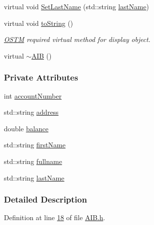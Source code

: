 \begin{DoxyCompactItemize}
\item 
virtual void \hyperlink{class_a_i_b_afe4e3c7b481bf87437968dde2cc75882_afe4e3c7b481bf87437968dde2cc75882}{Set\+Last\+Name} (std\+::string \hyperlink{class_a_i_b_ace7b8b648d1b44b7ee2f4be002952b7a_ace7b8b648d1b44b7ee2f4be002952b7a}{last\+Name})
\item 
virtual void \hyperlink{class_a_i_b_aff0f0a0db75a17efec4bd500b888232d_aff0f0a0db75a17efec4bd500b888232d}{to\+String} ()
\begin{DoxyCompactList}\small\item\em \hyperlink{class_o_s_t_m}{O\+S\+TM} required virtual method for display object. \end{DoxyCompactList}\item 
virtual \hyperlink{class_a_i_b_a22b11c50b0986326c86315957528bf79_a22b11c50b0986326c86315957528bf79}{$\sim$\+A\+IB} ()
\end{DoxyCompactItemize}
\subsubsection*{Private Attributes}
\begin{DoxyCompactItemize}
\item 
int \hyperlink{class_a_i_b_aafc08efeec5b8c800c32ee32f20603a7_aafc08efeec5b8c800c32ee32f20603a7}{account\+Number}
\item 
std\+::string \hyperlink{class_a_i_b_ae6a67cc33d1e5fa83a52a238e45ca3dc_ae6a67cc33d1e5fa83a52a238e45ca3dc}{address}
\item 
double \hyperlink{class_a_i_b_a3c8d637bd997c1f062d844a88e2559ba_a3c8d637bd997c1f062d844a88e2559ba}{balance}
\item 
std\+::string \hyperlink{class_a_i_b_a869f72057cb63ebf0cfd257069e15c7c_a869f72057cb63ebf0cfd257069e15c7c}{first\+Name}
\item 
std\+::string \hyperlink{class_a_i_b_a818b0cc283af23127c067fb3fc751058_a818b0cc283af23127c067fb3fc751058}{fullname}
\item 
std\+::string \hyperlink{class_a_i_b_ace7b8b648d1b44b7ee2f4be002952b7a_ace7b8b648d1b44b7ee2f4be002952b7a}{last\+Name}
\end{DoxyCompactItemize}


\subsubsection{Detailed Description}


Definition at line \hyperlink{_a_i_b_8h_source_l00018}{18} of file \hyperlink{_a_i_b_8h_source}{A\+I\+B.\+h}.



